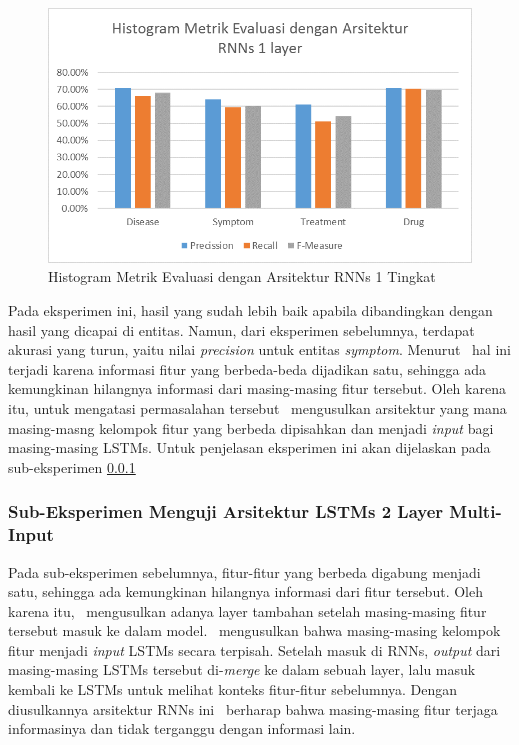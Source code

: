     \begin{figure}
    	\centering
    	\includegraphics[width=0.85\linewidth]{images/histogram9}
    	\caption{Histogram Metrik Evaluasi dengan Arsitektur RNNs 1 Tingkat}
    	\label{fig:owndict9}
    \end{figure}
    
    Pada eksperimen ini, hasil yang sudah lebih baik apabila dibandingkan dengan hasil yang dicapai \cite{skripsiKakRadit} di entitas. Namun, dari eksperimen sebelumnya, terdapat akurasi yang turun, yaitu nilai \textit{precision} untuk entitas \textit{symptom}. Menurut \saya~hal ini terjadi karena informasi fitur yang berbeda-beda dijadikan satu, sehingga ada kemungkinan hilangnya informasi dari masing-masing fitur tersebut. Oleh karena itu, untuk mengatasi permasalahan tersebut \saya~mengusulkan arsitektur yang mana masing-masng kelompok fitur yang berbeda dipisahkan dan menjadi \textit{input} bagi masing-masing LSTMs. Untuk penjelasan eksperimen ini akan dijelaskan pada sub-eksperimen \ref{eks2:subeksrnn2}
    
    
    \subsubsection{Sub-Eksperimen Menguji Arsitektur LSTMs 2 Layer Multi-Input}\label{eks2:subeksrnn2}
    Pada sub-eksperimen sebelumnya, fitur-fitur yang berbeda digabung menjadi satu, sehingga ada kemungkinan hilangnya informasi dari fitur tersebut. Oleh karena itu, \saya~mengusulkan adanya layer tambahan setelah masing-masing fitur tersebut masuk ke dalam model. \Saya~mengusulkan bahwa masing-masing kelompok fitur menjadi \textit{input} LSTMs secara terpisah. Setelah masuk di RNNs, \textit{output} dari masing-masing LSTMs tersebut di-\textit{merge} ke dalam sebuah layer, lalu masuk kembali ke LSTMs untuk melihat konteks fitur-fitur sebelumnya. Dengan diusulkannya arsitektur RNNs ini \saya~berharap bahwa masing-masing fitur terjaga informasinya dan tidak terganggu dengan informasi lain.
    
